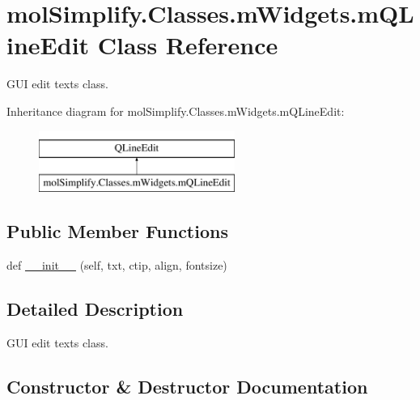 \hypertarget{classmolSimplify_1_1Classes_1_1mWidgets_1_1mQLineEdit}{}\section{mol\+Simplify.\+Classes.\+m\+Widgets.\+m\+Q\+Line\+Edit Class Reference}
\label{classmolSimplify_1_1Classes_1_1mWidgets_1_1mQLineEdit}


G\+UI edit texts class.  


Inheritance diagram for mol\+Simplify.\+Classes.\+m\+Widgets.\+m\+Q\+Line\+Edit\+:\begin{figure}[H]
\begin{center}
\leavevmode
\includegraphics[height=2.000000cm]{classmolSimplify_1_1Classes_1_1mWidgets_1_1mQLineEdit}
\end{center}
\end{figure}
\subsection*{Public Member Functions}
\begin{DoxyCompactItemize}
\item 
def \hyperlink{classmolSimplify_1_1Classes_1_1mWidgets_1_1mQLineEdit_a136a1b549a57a9cc1fd996851bc3269c}{\+\_\+\+\_\+init\+\_\+\+\_\+} (self, txt, ctip, align, fontsize)
\end{DoxyCompactItemize}


\subsection{Detailed Description}
G\+UI edit texts class. 

\subsection{Constructor \& Destructor Documentation}
\mbox{\label{classmolSimplify_1_1Classes_1_1mWidgets_1_1mQLineEdit_a136a1b549a57a9cc1fd996851bc3269c}} 
